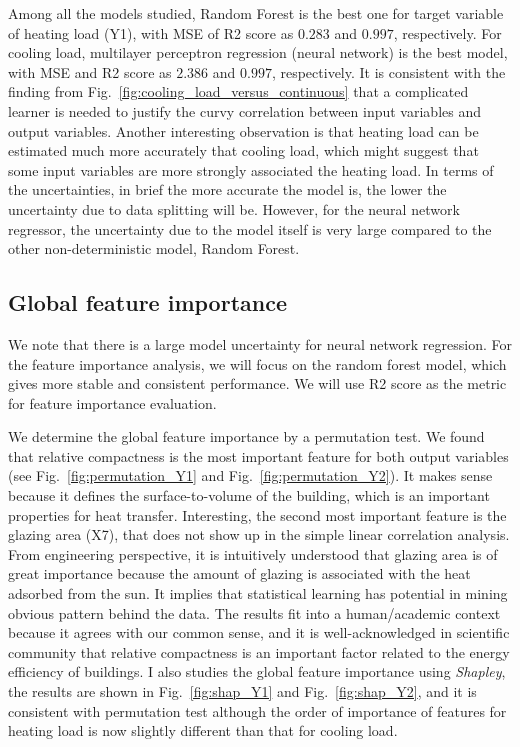 \documentclass{article}
\begin{document}
Among all the models studied, Random Forest is the best one for target variable of heating load (Y1), with MSE of R2 score as $0.283$ and $0.997$, respectively. For cooling load, multilayer perceptron regression (neural network) is the  best model, with MSE and  R2 score as $2.386$ and $0.997$, respectively. It is consistent with the finding from Fig.~\ref{fig:cooling_load_versus_continuous} that a complicated learner is needed to justify the curvy correlation between input variables and output variables.
Another interesting observation is that heating load can be estimated much more accurately that cooling load, which might suggest that some input variables are more strongly associated the heating load. In terms of the uncertainties, in brief the more accurate the model is, the lower the uncertainty due to data splitting will be. However, for the neural network regressor, the uncertainty due to the model itself is very large compared to the other non-deterministic model, Random Forest. 

\subsection{Global feature importance \label{subsec:gfi}}
We note that there is a large model uncertainty for neural network regression. For the feature importance analysis, we will focus on the random forest model, which gives more stable and consistent performance. We will use R2 score as the metric for feature importance evaluation. 

We determine the global feature importance by a permutation test. We found that relative compactness is the most important feature for both output variables (see Fig.~\ref{fig:permutation_Y1} and Fig.~\ref{fig:permutation_Y2}). It makes sense because it defines the surface-to-volume of the building, which is an important properties for heat transfer. Interesting, the second most important feature is the glazing area (X7), that does not show up in the simple linear correlation analysis. From engineering perspective, it is intuitively understood that glazing area is of great importance because the amount of glazing is associated with the heat adsorbed from the sun. It implies that statistical learning has potential in mining  obvious pattern behind the data. The results fit into a human/academic context because it agrees with our common sense, and it is well-acknowledged in scientific community that relative compactness is an important factor related to the energy efficiency of buildings. I also studies the global feature importance using \textit{Shapley}, the results are shown in Fig.~\ref{fig:shap_Y1} and Fig.~\ref{fig:shap_Y2}, and it is consistent with permutation test although 
the order of importance of features for heating load is now slightly different than that for cooling load.
\end{document}
